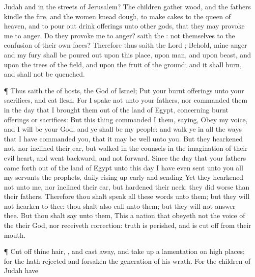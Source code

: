 {Judah and in the
streets of
Jerusalem?
The
children
gather
wood, and the
fathers
kindle the
fire, and the
women
knead
{}
dough, to
make
cakes to the
queen of
heaven, and to pour
out drink
offerings unto
other
gods, that they may provoke me to
anger.
Do they provoke me to
anger?
saith the
{}:
{} not
{} themselves to the
confusion of their own
faces?
Therefore thus
saith the
Lord
{}; Behold, mine
anger and my
fury shall be poured
out upon this
place, upon
man, and upon
beast, and upon the
trees of the
field, and upon the
fruit of the
ground; and it shall
burn, and shall not be
quenched.
\par }{\PP {}¶ Thus
saith the
{} of
hosts, the
God of
Israel;
Put your burnt
offerings unto your
sacrifices, and
eat
flesh.
For I
spake not unto your
fathers, nor
commanded them in the
day that I brought them
out of the
land of
Egypt,
concerning burnt
offerings or
sacrifices:
But this
thing
commanded I them,
saying,
Obey my
voice, and I will be your
God, and ye shall be my
people: and
walk ye in all the
ways that I have
commanded you, that it may be
well unto you.
But they
hearkened not, nor
inclined their
ear, but
walked in the
counsels
{} in the
imagination of their
evil
heart, and went
backward, and not
forward.
Since the
day that your
fathers came forth
out of the
land of
Egypt unto this
day I have even
sent unto you all my
servants the
prophets,
daily rising up
early and
sending
{}
Yet they
hearkened not unto me, nor
inclined their
ear, but
hardened their
neck: they did
worse than their
fathers.
Therefore thou shalt
speak all these
words unto them; but they will not
hearken to thee: thou shalt also
call unto them; but they will not
answer thee.
But thou shalt
say unto them, This
{} a
nation that
obeyeth not the
voice of the
{} their
God, nor
receiveth
correction:
truth is
perished, and is cut
off from their
mouth.
\par }{\PP {}¶ Cut
off thine
hair,
{}, and cast
{}
away, and take
up a
lamentation on high
places; for the
{} hath
rejected and
forsaken the
generation of his
wrath.
For the
children of
Judah have
}
